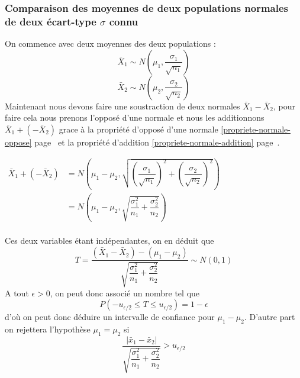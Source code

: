 \subsubsection{Comparaison des moyennes de deux populations normales de deux écart-type $\sigma$ connu}
On commence avec deux moyennes des deux populations :
$$\bar{X}_1 \sim N \left( \mu_1, \dfrac{\sigma_1}{\sqrt{n_1}} \right)$$
$$\bar{X}_2 \sim N \left( \mu_2, \dfrac{\sigma_2}{\sqrt{n_2}} \right)$$
Maintenant nous devons faire une soustraction de deux normales $\bar{X}_1 - \bar{X}_2$, pour faire cela nous prenons l'opposé d'une normale et nous les additionnons $\bar{X}_1 + (-\bar{X}_2)$ grace à la propriété d'opposé d'une normale \ref{propriete-normale-oppose} page~\pageref{propriete-normale-oppose} et la propriété d'addition \ref{propriete-normale-addition} page~\pageref{propriete-normale-addition}.
\begin{center}
$\begin{array}{LL}
\bar{X}_1 + (-\bar{X}_2) &= N \left( \mu_1 - \mu_2, \sqrt{\left(\dfrac{\sigma_1}{\sqrt{n_1}}\right)^2 + \left(\dfrac{\sigma_2}{\sqrt{n_2}}\right)^2} \right)\\
                      &= N \left( \mu_1 - \mu_2, \sqrt{\dfrac{\sigma_1^2}{n_1} + \dfrac{\sigma_2^2}{n_2}} \right)\\
\end{array}$
\end{center}
Ces deux variables étant indépendantes, on en déduit que
$$\boxed{T = \dfrac{(\bar{X}_1 - \bar{X}_2) - (\mu_1 - \mu_2)}{\sqrt{\dfrac{\sigma_1^2}{n_1} + \dfrac{\sigma_2^2}{n_2}}} \sim N(0,1)}$$
A tout $\epsilon > 0$, on peut donc associé un nombre tel que $$P\left(-u_{\epsilon/2} \leq T \leq u_{\epsilon/2} \right) = 1 - \epsilon$$ d'où on peut donc déduire un intervalle de confiance pour $\mu_1 - \mu_2$. D'autre part on rejettera l'hypothèse $\mu_1 = \mu_2$ si $$\dfrac{|\bar{x}_1 - \bar{x}_2|}{\sqrt{\dfrac{\sigma_1^2}{n_1} + \dfrac{\sigma_2^2}{n_2}}} > u_{\epsilon/2}$$










\newpage
